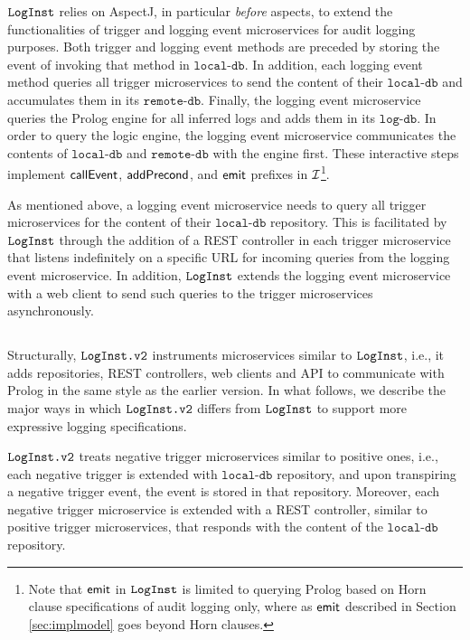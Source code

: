 $\texttt{LogInst}$ relies on AspectJ, in particular \emph{before} aspects,  to extend the functionalities of trigger and logging event microservices for audit logging purposes. Both trigger and logging event methods are preceded by storing the event of invoking that method in $\texttt{local-db}$. In addition, each logging event method queries all trigger microservices to send the content of their $\texttt{local-db}$ and accumulates them in its $\texttt{remote-db}$. Finally, the logging event microservice queries the Prolog engine for all inferred logs and adds them in its $\texttt{log-db}$. In order to query the logic engine, the logging event microservice communicates the contents of $\texttt{local-db}$ and $\texttt{remote-db}$ with the engine first. These interactive steps implement $\mathsf{callEvent}$, $\mathsf{addPrecond}$, and $\mathsf{emit}$ prefixes in $\mathcal{I}$\footnote{Note that $\mathsf{emit}$ in $\texttt{LogInst}$ is limited to querying Prolog based on Horn clause specifications of audit logging only, where as $\mathsf{emit}$ described in Section \ref{sec:implmodel} goes beyond Horn clauses.}. 

As mentioned above, a logging event microservice needs to query all trigger microservices for the content of their $\texttt{local-db}$ repository. This is facilitated by $\texttt{LogInst}$ through the addition of a REST controller in each trigger microservice that listens indefinitely on a specific URL for incoming queries from the logging event microservice. In addition, $\texttt{LogInst}$ extends the logging event microservice with a web client to send such queries to the trigger microservices asynchronously.



\subsection{\tooll}
Structurally, $\texttt{LogInst.v2}$ instruments microservices similar to $\texttt{LogInst}$, i.e., it adds repositories, REST controllers, web clients and API to communicate with Prolog in the same style as the earlier version. In what follows, we describe the major ways in which $\texttt{LogInst.v2}$ differs from $\texttt{LogInst}$ to support more expressive logging specifications.

$\texttt{LogInst.v2}$ treats negative trigger microservices similar to positive ones, i.e., each negative trigger is extended with $\texttt{local-db}$ repository, and upon transpiring a negative trigger event, the event is stored in that repository. Moreover, each negative trigger microservice is extended with a REST controller, similar to positive trigger microservices, that responds with the content of the $\texttt{local-db}$ repository. 

